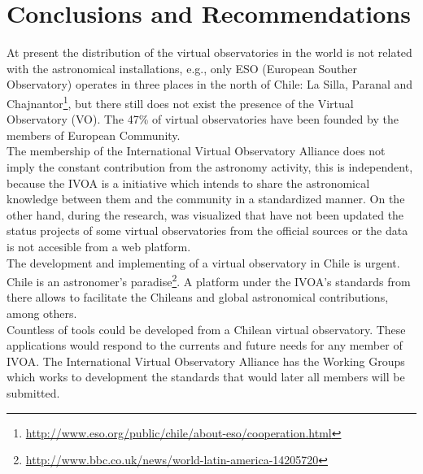 \section{Conclusions and Recommendations}
At present the distribution of the virtual observatories in the world is not
related with the astronomical installations, e.g., only ESO (European Souther
Observatory) operates in three places in the north of Chile: La Silla, Paranal
and
Chajnantor\footnote{\url{http://www.eso.org/public/chile/about-eso/cooperation.html}},
but there still does not exist the presence of the Virtual Observatory (VO).
The 47\% of virtual observatories have been founded by the members of European
Community.\\

The membership of the International Virtual Observatory Alliance does not imply
the constant contribution from the astronomy activity, this is independent,
because the IVOA is a initiative which intends to share the astronomical
knowledge between them and the community in a standardized manner. On the other
hand, during the research, was visualized that have not been updated the status
projects of some virtual observatories from the official sources or the data is
not accesible from a web platform.\\

The development and implementing of a virtual observatory in Chile is urgent.
Chile is an astronomer's
paradise\footnote{\url{http://www.bbc.co.uk/news/world-latin-america-14205720}}.
A platform under the IVOA's standards from there allows to facilitate the
Chileans and global astronomical contributions, among others.\\

Countless of tools could be developed from a Chilean virtual observatory. These
applications would respond to the currents and future needs for any member of
IVOA. The International Virtual Observatory Alliance has the Working Groups
which works to development the standards that would later all members will be
submitted.\\
